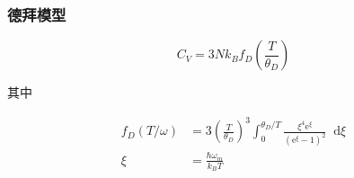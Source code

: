 \documentclass{article}
\newcommand*{\md}{\mathop{}\!\mathrm{d}}
\newcommand*{\me}{\mathrm{e}}
\begin{document}
\begin{multicols}{2}
\subsubsection{德拜模型}

\begin{equation*}
  C_V = 3Nk_B f_D \left( \frac{T}{\theta_D} \right)
\end{equation*}

其中

\begin{equation*}
  \begin{aligned}
    f_D \left( T / \omega \right) &= 3 \left( \frac{T}{\theta_D}  \right)^3 \int_0^{\theta_D / T} \frac{\xi^4 \me^{\xi}}{\left( \me^{\xi} - 1 \right)^2} \md \xi \\
    \xi &= \frac{\hbar \omega_m}{k_B T}
  \end{aligned}
\end{equation*}













\end{multicols}
\end{document}
